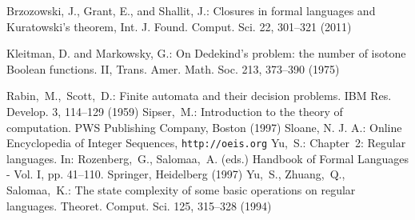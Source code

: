 \documentclass[runningheads]{llncs}
\begin{document}
\begin{thebibliography}{00}
\label{***biblio}

 Brzozowski, J., Grant, E., and Shallit, J.:  
Closures in formal languages and Kuratowski's theorem,
Int. J. Found. Comput. Sci. 22, 301--321 (2011)

 Kleitman, D. and Markowsky, G.:
On Dedekind's problem: the number of isotone Boolean functions. II,
Trans. Amer. Math. Soc. 213, 373--390 (1975)

 \mbox{Rabin, M.,  Scott, D.:}
    Finite automata and their decision problems.
    IBM Res. Develop. 3,  114--129 (1959)
 \mbox{Sipser, M.:}
    Introduction to the theory of computation.
    PWS Publishing Company, Boston (1997)
 Sloane, N. J. A.:
	Online Encyclopedia of Integer Sequences,
	{\tt http://oeis.org}
 \mbox{Yu, S.:}
    Chapter~2: Regular languages.
    In: \mbox{Rozenberg, G.,} \mbox{Salomaa, A.} (eds.)
    Handbook of Formal Languages - Vol. I, pp. 41--110.
    Springer,  Heidelberg (1997)  
 \mbox{Yu, S.,} \mbox{Zhuang, Q.,}   \mbox{Salomaa, K.:}
    The state complexity of some basic operations on regular languages.
    Theoret. Comput. Sci. 125, 315--328 (1994)

\end{thebibliography}
\end{document}
